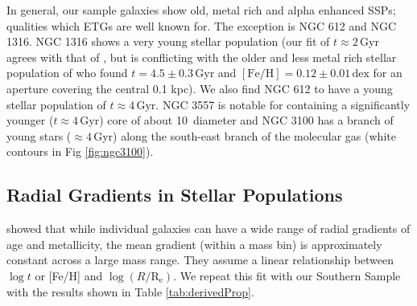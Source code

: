 \documentclass[a4paper,fleqn,usenatbib]{mnras}
\begin{document}
	In general, our sample galaxies show old, metal rich and alpha enhanced SSPs; qualities which ETGs are well known for. The exception is NGC 612 and NGC 1316. NGC 1316 shows a very young stellar population (our fit of $t \approx 2$\,Gyr agrees with that of \citealt{Kuntschner2000}, but is conflicting with the older and less metal rich stellar population of \citealt{Koleva2011} who found $t=4.5 \pm 0.3 \,\mathrm{Gyr}$ and $\mathrm{[Fe/H]}=0.12 \pm 0.01 \,\mathrm{dex}$ for an aperture covering the central 0.1 kpc). We also find NGC 612 to have a young stellar population of $t\approx 4\,\mathrm{Gyr}$. NGC 3557 is notable for containing a significantly younger ($t\approx 4$\,Gyr) core of about 10\arcsec\ diameter and NGC 3100 has a branch of young stars ($\approx 4$\,Gyr) along the south-east branch of the molecular gas (white contours in Fig \ref{fig:ngc3100}).

	\subsection{Radial Gradients in Stellar Populations}
		\label{subsec:popGrad}

		\citet{Koleva2011} showed that while individual galaxies can have a wide range of radial gradients of age and metallicity, the mean gradient (within a mass bin) is approximately constant across a large mass range. They assume a linear relationship between $\log t$ or [Fe/H] and $\log (R/\mathrm{R_e})$. We repeat this fit with our Southern Sample with the results shown in Table \ref{tab:derivedProp}. 
\end{document}
